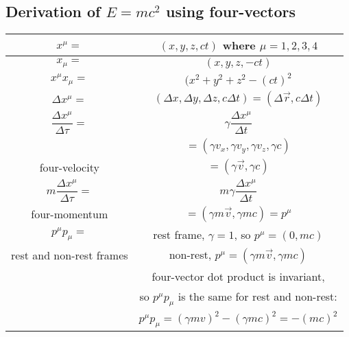 \subsection{Derivation of $E=mc^2$ using four-vectors} 
\center
\begin{tabular}{|c|c|}
\hline

$x^\mu =  $& $(x,y,z,ct) $ where $\mu = 1,2,3,4$

\\ \hline

$x_\mu = $ & $(x,y,z,-ct)$

\\ \hline

$x^\mu x_\mu = $ & $(x^2+y^2+z^2-(ct)^2$

\\ \hline

$\Delta x^\mu =$ & $(\Delta x, \Delta y, \Delta z, c \Delta t) = ( \Delta \vec r, c \Delta t)$

\\ \hline

$\dfrac{\Delta x^\mu}{\Delta \tau} = $ & $\gamma \dfrac{\Delta x^\mu}{\Delta t} $\\

 & $ = (\gamma v_x, \gamma v_y, \gamma v_z, \gamma c) $ \\

four-velocity & $ = (\gamma \vec v, \gamma c) $

\\ \hline

$m \dfrac{\Delta x^\mu}{\Delta \tau} = $ &  $m \gamma \dfrac{\Delta x^\mu}{\Delta t} $\\

four-momentum & $=  (\gamma m \vec v, \gamma m c) = p^\mu$

\\ \hline

$p^\mu p_\mu = $ & rest frame,  $\gamma = 1$, so $p^\mu = (0, mc)$ \\

rest and non-rest frames & non-rest, $p^\mu = (\gamma m \vec v, \gamma m c) $ \\

 &  four-vector dot product is invariant, \\ 
 & so $p^\mu p_\mu$ is the same for rest and non-rest: \\
& $p^\mu p_\mu = (\gamma m v)^2 - (\gamma m c)^2 = -(mc)^2$

\\ \hline

\end{tabular}

